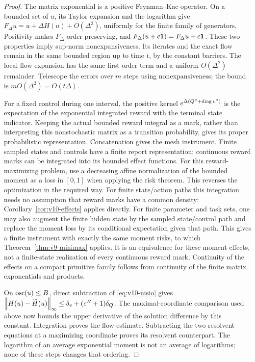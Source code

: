 \begin{proof}
The matrix exponential is a positive Feynman--Kac operator. On a
bounded set of $u$, its Taylor expansion and the logarithm give
$F_\Delta u=u+\Delta H(u)+O(\Delta^2)$, uniformly for the finite
family of generators. Positivity makes $F_\Delta$ order preserving,
and $F_\Delta(u+c\mathbf 1)=F_\Delta u+c\mathbf 1$. These two properties imply
sup-norm nonexpansiveness. Its iterates and the exact flow remain
in the same bounded region up to time $t$, by the constant barriers.
The local flow expansion has the same first-order term and a uniform
$O(\Delta^2)$ remainder. Telescope the errors over $m$ steps using
nonexpansiveness; the bound is $mO(\Delta^2)=O(t\Delta)$.

For a fixed control during one interval, the positive kernel
$e^{\Delta(Q^a+\operatorname{diag} v^a)}$ is the expectation of the exponential
integrated reward with the terminal state indicator. Keeping the
actual bounded reward integral as a mark, rather than interpreting
this nonstochastic matrix as a transition probability, gives its
proper probabilistic representation. Concatenation gives the mesh
instrument. Finite sampled states and controls have a finite report
representation; continuous reward marks can be integrated into its
bounded effect functions. For this reward-maximizing problem, use a decreasing affine
normalization of the bounded moment as a loss in $[0,1]$ when applying
the risk theorem. This reverses the optimization in the required way. For finite state/action
paths this integration needs no assumption that reward marks have a
common density: Corollary~\ref{cor:v10-effects} applies directly.
For finite parameter and task sets, one may also augment the finite
hidden state by the sampled state/control path and replace the moment
loss by its conditional expectation given that path. This gives a
finite instrument with exactly the same moment risks, to which
Theorem~\ref{thm:v9-minimax} applies. It is an equivalence for these
moment effects, not a finite-state realization of every continuous
reward mark. Continuity of the effects on a compact primitive family
follows from continuity of the finite matrix exponentials and products.

On $\operatorname{osc}(u)\le B$, direct subtraction of \eqref{eq:v10-nisio} gives
$\left\lVert H(u)-\widetilde H(u)\right\rVert_\infty
\le\delta_v+(e^B+1)\delta_Q$. The maximal-coordinate comparison used
above now bounds the upper derivative of the solution difference by
this constant. Integration proves the flow estimate. Subtracting
the two resolvent equations at a maximizing coordinate proves its
resolvent counterpart. The logarithm of an average exponential
moment is not an average of logarithms; none of these steps changes
that ordering.
\end{proof}

